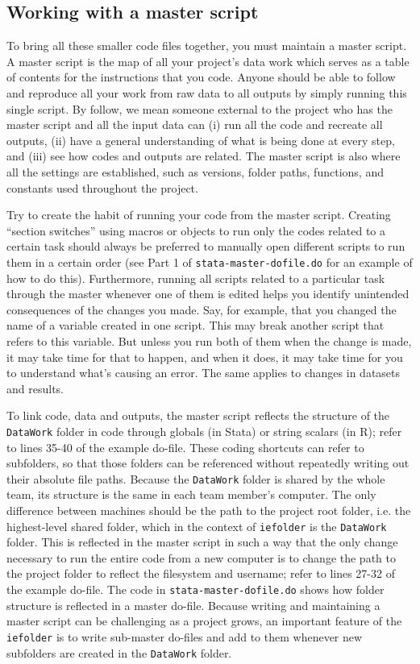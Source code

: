 \subsection{Working with a master script}
To bring all these smaller code files together, you must maintain a master script.
A master script is the map of all your project's data work
which serves as a table of contents for the instructions that you code.
Anyone should be able to follow and reproduce all your work from
raw data to all outputs by simply running this single script.
By follow, we mean someone external to the project who has the master script and all the input data can
(i) run all the code and recreate all outputs,
(ii) have a general understanding of what is being done at every step, and
(iii) see how codes and outputs are related.
The master script is also where all the settings are established,
such as versions, folder paths, functions, and constants used throughout the project.

Try to create the habit of running your code from the master script.
Creating ``section switches'' using macros or objects to run only the codes related to a certain task
should always be preferred to manually open different scripts to run them in a certain order
(see Part 1 of \texttt{stata-master-dofile.do} for an example of how to do this).
Furthermore, running all scripts related to a particular task through the master whenever one of them is edited
helps you identify unintended consequences of the changes you made.
Say, for example, that you changed the name of a variable created in one script.
This may break another script that refers to this variable.
But unless you run both of them when the change is made, it may take time for that to happen,
and when it does, it may take time for you to understand what's causing an error.
The same applies to changes in datasets and results.

To link code, data and outputs,
the master script reflects the structure of the \texttt{DataWork} folder in code
through globals (in Stata) or string scalars (in R);
refer to lines 35-40 of the example do-file.
These coding shortcuts can refer to subfolders,
so that those folders can be referenced without repeatedly writing out their absolute file paths.
Because the \texttt{DataWork} folder is shared by the whole team,
its structure is the same in each team member's computer.
The only difference between machines should be
the path to the project root folder, i.e. the highest-level shared folder,
which in the context of \texttt{iefolder} is the \texttt{DataWork} folder.
This is reflected in the master script in such a way that
the only change necessary to run the entire code from a new computer
is to change the path to the project folder to reflect the filesystem and username;
refer to lines 27-32 of the example do-file.
The code in \texttt{stata-master-dofile.do} shows how folder structure is reflected in a master do-file.
Because writing and maintaining a master script can be challenging as a project grows,
an important feature of the \texttt{iefolder} is to write sub-master do-files
and add to them whenever new subfolders are created in the \texttt{DataWork} folder.

